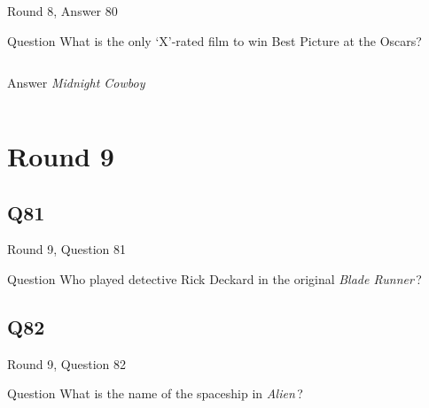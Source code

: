 \documentclass[11pt]{beamer}
\begin{document}
\begin{frame}[t]{Round 8, Answer 80}
  \vspace{2em}
  \begin{block}{Question}
    What is the only `X'-rated film to win Best Picture at the Oscars?
  \end{block}
  \pause{}
  \begin{columns}[T,totalwidth=\linewidth]
    \begin{column}{0.35\linewidth}
      \begin{block}{Answer}
        \emph{Midnight Cowboy}
      \end{block}
    \end{column}
    \begin{column}{0.6\linewidth}
      \begin{center}
        \texttt{[image: \{Images/Midnight-Cowboy]}.jpg}
      \end{center}
    \end{column}
  \end{columns}
\end{frame}


\section{Round 9}


\subsection*{Q81}
\begin{frame}[t]{Round 9, Question 81}
  \vspace{2em}
  \begin{block}{Question}
    Who played detective Rick Deckard in the original \emph{Blade Runner}\,?
  \end{block}
\end{frame}


\subsection*{Q82}
\begin{frame}[t]{Round 9, Question 82}
  \vspace{2em}
  \begin{block}{Question}
    What is the name of the spaceship in \emph{Alien}\,?
  \end{block}
\end{frame}
\end{document}
